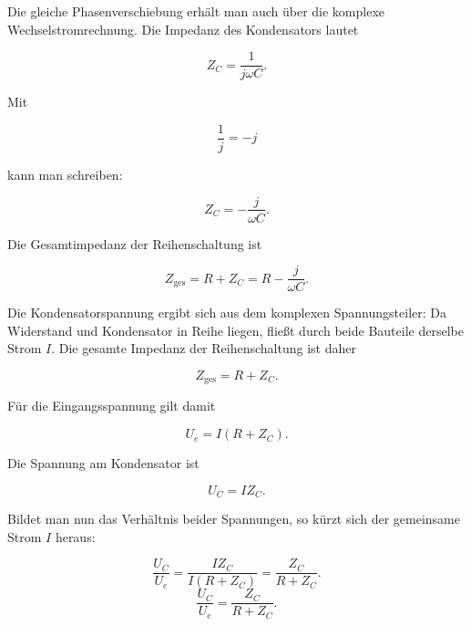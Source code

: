 Die gleiche Phasenverschiebung erhält man auch über die komplexe
Wechselstromrechnung. Die Impedanz des Kondensators lautet

\begin{equation}
	Z_C
	=
	\frac{1}{j\omega C}.
	\label{eq:rc-phase-impedanz-kondensator}
\end{equation}

Mit

\begin{equation}
	\frac{1}{j}=-j
	\label{eq:rc-phase-eins-durch-j}
\end{equation}

kann man schreiben:

\begin{equation}
	Z_C
	=
	-\frac{j}{\omega C}.
	\label{eq:rc-phase-impedanz-kondensator-minus-j}
\end{equation}

Die Gesamtimpedanz der Reihenschaltung ist

\begin{equation}
	Z_\mathrm{ges}
	=
	R+Z_C
	=
	R-\frac{j}{\omega C}.
	\label{eq:rc-phase-gesamtimpedanz}
\end{equation}

Die Kondensatorspannung ergibt sich aus dem komplexen Spannungsteiler:
Da Widerstand und Kondensator in Reihe liegen, fließt durch beide Bauteile
derselbe Strom \(I\). Die gesamte Impedanz der Reihenschaltung ist daher

\begin{equation}
	Z_\mathrm{ges}
	=
	R+Z_C.
	\label{eq:rc-gesamtimpedanz-spannungsteiler}
\end{equation}

Für die Eingangsspannung gilt damit

\begin{equation}
	U_e
	=
	I\left(R+Z_C\right).
	\label{eq:rc-eingangsspannung-komplex}
\end{equation}

Die Spannung am Kondensator ist

\begin{equation}
	U_C
	=
	I Z_C.
	\label{eq:rc-kondensatorspannung-komplex}
\end{equation}

Bildet man nun das Verhältnis beider Spannungen, so kürzt sich der gemeinsame
Strom \(I\) heraus:

\begin{equation}
	\frac{U_C}{U_e}
	=
	\frac{I Z_C}{I\left(R+Z_C\right)}
	=
	\frac{Z_C}{R+Z_C}.
	\label{eq:rc-spannungsteiler-herleitung}
\end{equation}
\begin{equation}
	\frac{U_C}{U_e}
	=
	\frac{Z_C}{R+Z_C}.
	\label{eq:rc-komplexer-spannungsteiler}
\end{equation}

